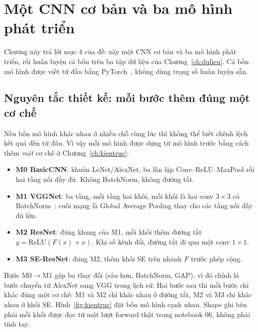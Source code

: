 \chapter{Một CNN cơ bản và ba mô hình phát triển}
\label{ch:mohinh}

Chương này trả lời mục 4 của đề: xây một CNN cơ bản và ba mô hình phát triển, rồi huấn luyện cả bốn trên ba tập
dữ liệu của Chương~\ref{ch:dulieu}. Cả bốn mô hình được viết từ đầu bằng PyTorch~\cite{paszke2019}, không dùng trọng số
huấn luyện sẵn.

\section{Nguyên tắc thiết kế: mỗi bước thêm đúng một cơ chế}

Nếu bốn mô hình khác nhau ở nhiều chỗ cùng lúc thì không thể biết chênh lệch kết quả đến từ đâu. Vì vậy mỗi mô hình
được dựng từ mô hình trước bằng cách thêm \emph{một} cơ chế ở Chương~\ref{ch:kientruc}:

\begin{itemize}
  \item \textbf{M0 BasicCNN}: khuôn LeNet/AlexNet, ba lần lặp Conv--ReLU--MaxPool rồi hai tầng nối đầy đủ. Không
        BatchNorm, không đường tắt.
  \item \textbf{M1 VGGNet}: ba tầng, mỗi tầng hai khối, mỗi khối là hai conv $3\times3$ có BatchNorm~\cite{ioffe2015};
        cuối mạng là Global Average Pooling thay cho các tầng nối đầy đủ lớn.
  \item \textbf{M2 ResNet}: đúng khung của M1, mỗi khối thêm đường tắt $y=\mathrm{ReLU}(F(x)+x)$. Khi số kênh đổi,
        đường tắt đi qua một conv $1\times1$.
  \item \textbf{M3 SE-ResNet}: đúng M2, thêm khối SE trên nhánh $F$ trước phép cộng.
\end{itemize}

Bước M0$\to$M1 gộp ba thay đổi (sâu hơn, BatchNorm, GAP), vì đó chính là bước chuyển từ AlexNet sang VGG trong lịch sử.
Hai bước sau thì mỗi bước chỉ khác đúng một cơ chế: M1 và M2 chỉ khác nhau ở đường tắt, M2 và M3 chỉ khác nhau ở khối SE.
Hình~\ref{fig:kientruc} đặt bốn mô hình cạnh nhau. Shape ghi bên phải mỗi khối được đọc từ một lượt forward thật trong
notebook 06, không phải tính tay.

